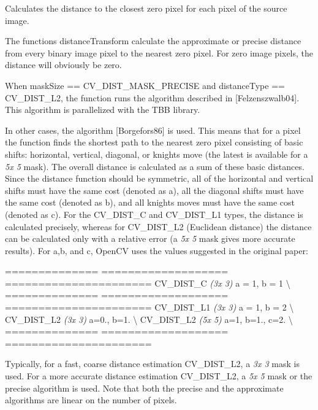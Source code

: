 Calculates the distance to the closest zero pixel for each pixel of the source image.

The functions {\ttfamily distance\+Transform} calculate the approximate or precise distance from every binary image pixel to the nearest zero pixel. For zero image pixels, the distance will obviously be zero.

When {\ttfamily mask\+Size == C\+V\+\_\+\+D\+I\+S\+T\+\_\+\+M\+A\+S\+K\+\_\+\+P\+R\+E\+C\+I\+SE} and {\ttfamily distance\+Type == C\+V\+\_\+\+D\+I\+S\+T\+\_\+\+L2}, the function runs the algorithm described in \mbox{[}Felzenszwalb04\mbox{]}. This algorithm is parallelized with the T\+BB library.

In other cases, the algorithm \mbox{[}Borgefors86\mbox{]} is used. This means that for a pixel the function finds the shortest path to the nearest zero pixel consisting of basic shifts\+: horizontal, vertical, diagonal, or knight\textquotesingle{}s move (the latest is available for a {\itshape 5x 5} mask). The overall distance is calculated as a sum of these basic distances. Since the distance function should be symmetric, all of the horizontal and vertical shifts must have the same cost (denoted as {\ttfamily a}), all the diagonal shifts must have the same cost (denoted as {\ttfamily b}), and all knight\textquotesingle{}s moves must have the same cost (denoted as {\ttfamily c}). For the {\ttfamily C\+V\+\_\+\+D\+I\+S\+T\+\_\+C} and {\ttfamily C\+V\+\_\+\+D\+I\+S\+T\+\_\+\+L1} types, the distance is calculated precisely, whereas for {\ttfamily C\+V\+\_\+\+D\+I\+S\+T\+\_\+\+L2} (Euclidean distance) the distance can be calculated only with a relative error (a {\itshape 5x 5} mask gives more accurate results). For {\ttfamily a},{\ttfamily b}, and {\ttfamily c}, Open\+CV uses the values suggested in the original paper\+:

============== =================== ====================== {\ttfamily C\+V\+\_\+\+D\+I\+S\+T\+\_\+C} {\itshape (3x 3)} a = 1, b = 1 \textbackslash{} ============== =================== ====================== {\ttfamily C\+V\+\_\+\+D\+I\+S\+T\+\_\+\+L1} {\itshape (3x 3)} a = 1, b = 2 \textbackslash{} {\ttfamily C\+V\+\_\+\+D\+I\+S\+T\+\_\+\+L2} {\itshape (3x 3)} a=0., b=1. \textbackslash{} {\ttfamily C\+V\+\_\+\+D\+I\+S\+T\+\_\+\+L2} {\itshape (5x 5)} a=1, b=1., c=2. \textbackslash{} ============== =================== ======================

Typically, for a fast, coarse distance estimation {\ttfamily C\+V\+\_\+\+D\+I\+S\+T\+\_\+\+L2}, a {\itshape 3x 3} mask is used. For a more accurate distance estimation {\ttfamily C\+V\+\_\+\+D\+I\+S\+T\+\_\+\+L2}, a {\itshape 5x 5} mask or the precise algorithm is used. Note that both the precise and the approximate algorithms are linear on the number of pixels.

